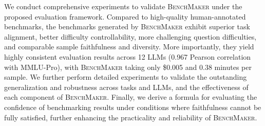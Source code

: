 We conduct comprehensive experiments to validate \textsc{BenchMaker}  under the proposed evaluation framework.
Compared to high-quality human-annotated benchmarks, the benchmarks generated by \textsc{BenchMaker} exhibit superior task alignment, better difficulty controllability, more challenging question difficulties, and comparable sample faithfulness and diversity.
More importantly, they yield highly consistent evaluation results across 12 LLMs (0.967 Pearson correlation with MMLU-Pro), with \textsc{BenchMaker} taking only \$0.005 and 0.38 minutes per sample.
We further perform detailed experiments to validate the outstanding generalization and robustness across tasks and LLMs, and the effectiveness of each component of \textsc{BenchMaker}.
Finally, we derive a formula for evaluating the confidence of benchmarking results under conditions where faithfulness cannot be fully satisfied, further enhancing the practicality and reliability of \textsc{BenchMaker}.



